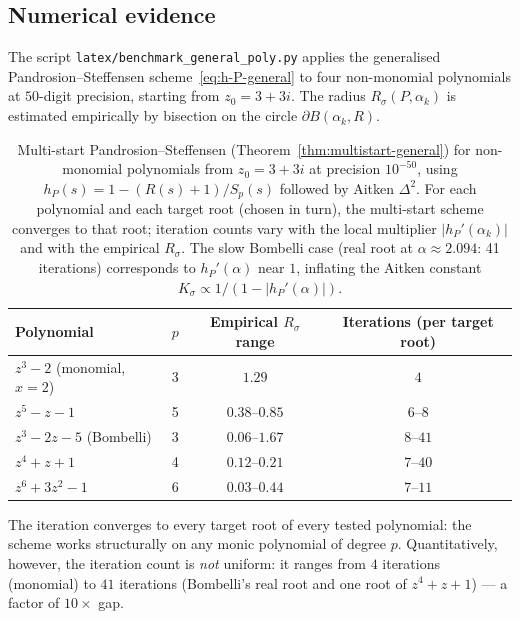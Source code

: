 \documentclass[11pt,a4paper]{article}
\theoremstyle{definition}
\begin{document}
\subsection{Numerical evidence}

The script \texttt{latex/benchmark\_general\_poly.py} applies the generalised Pandrosion--Steffensen scheme~\eqref{eq:h-P-general} to four non-monomial polynomials at $50$-digit precision, starting from $z_0 = 3 + 3i$. The radius $R_\sigma(P, \alpha_k)$ is estimated empirically by bisection on the circle $\partial B(\alpha_k, R)$.

\begin{table}[H]
\centering
\small
\renewcommand{\arraystretch}{1.2}
\begin{tabular}{lccc}
\toprule
Polynomial & $p$ & Empirical $R_\sigma$ range & Iterations (per target root) \\
\midrule
$z^3 - 2$ (monomial, $x=2$)   & 3 & $1.29$          & $4$ \\
$z^5 - z - 1$                 & 5 & $0.38$--$0.85$  & $6$--$8$ \\
$z^3 - 2z - 5$ (Bombelli)     & 3 & $0.06$--$1.67$  & $8$--$41$ \\
$z^4 + z + 1$                 & 4 & $0.12$--$0.21$  & $7$--$40$ \\
$z^6 + 3z^2 - 1$              & 6 & $0.03$--$0.44$  & $7$--$11$ \\
\bottomrule
\end{tabular}
\caption{Multi-start Pandrosion--Steffensen (Theorem~\ref{thm:multistart-general}) for non-monomial polynomials from $z_0 = 3 + 3i$ at precision $10^{-50}$, using $h_P(s) = 1 - (R(s) + 1)/S_p(s)$ followed by Aitken $\Delta^2$. For each polynomial and each target root (chosen in turn), the multi-start scheme converges to that root; iteration counts vary with the local multiplier $|h_P'(\alpha_k)|$ and with the empirical $R_\sigma$. The slow Bombelli case (real root at $\alpha \approx 2.094$: 41 iterations) corresponds to $h_P'(\alpha)$ near $1$, inflating the Aitken constant $K_\sigma \propto 1/(1 - |h_P'(\alpha)|)$.}
\label{tab:multistart-general}
\end{table}

The iteration converges to every target root of every tested polynomial: the scheme works structurally on any monic polynomial of degree $p$. Quantitatively, however, the iteration count is \emph{not} uniform: it ranges from $4$ iterations (monomial) to $41$ iterations (Bombelli's real root and one root of $z^4 + z + 1$) --- a factor of $10\times$ gap.
\end{document}
